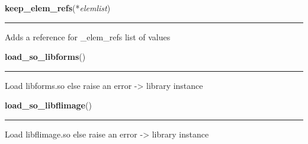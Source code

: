     \label{xformslib:library:keep_elem_refs}

    \vspace{0.5ex}

\hspace{.8\funcindent}\begin{boxedminipage}{\funcwidth}

    \raggedright \textbf{keep\_elem\_refs}(*\textit{elemlist})

    \vspace{-1.5ex}

    \rule{\textwidth}{0.5\fboxrule}
\setlength{\parskip}{2ex}
    Adds a reference for \_elem\_refs list of values

\setlength{\parskip}{1ex}
    \end{boxedminipage}

    \label{xformslib:library:load_so_libforms}

    \vspace{0.5ex}

\hspace{.8\funcindent}\begin{boxedminipage}{\funcwidth}

    \raggedright \textbf{load\_so\_libforms}()

    \vspace{-1.5ex}

    \rule{\textwidth}{0.5\fboxrule}
\setlength{\parskip}{2ex}
    Load libforms.so else raise an error -{\textgreater} library instance

\setlength{\parskip}{1ex}
    \end{boxedminipage}

    \label{xformslib:library:load_so_libflimage}

    \vspace{0.5ex}

\hspace{.8\funcindent}\begin{boxedminipage}{\funcwidth}

    \raggedright \textbf{load\_so\_libflimage}()

    \vspace{-1.5ex}

    \rule{\textwidth}{0.5\fboxrule}
\setlength{\parskip}{2ex}
    Load libflimage.so else raise an error -{\textgreater} library instance

\setlength{\parskip}{1ex}
    \end{boxedminipage}

